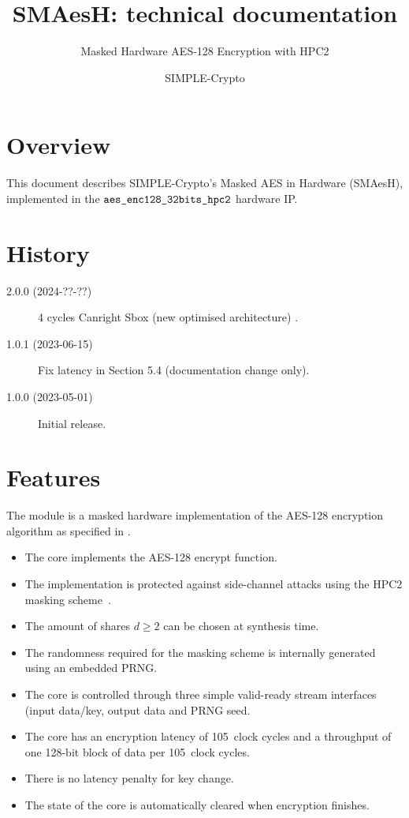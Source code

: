 \documentclass{scrartcl}
\title{SMAesH: technical documentation}
\subtitle{Masked Hardware AES-128 Encryption with HPC2}
\author{SIMPLE-Crypto}
\date{}
\begin{document}


\maketitle

\tableofcontents

\section{Overview}
\label{section:overview}
This document describes SIMPLE-Crypto's Masked AES in Hardware (SMAesH),
implemented in the $\texttt{aes\_enc128\_32bits\_hpc2}$ hardware IP. 

\section{History}

\begin{description}
    \item[2.0.0 (2024-??-??)] 4 cycles Canright Sbox (new optimised architecture) .
    \item[1.0.1 (2023-06-15)] Fix latency in Section 5.4 (documentation change only).
    \item[1.0.0 (2023-05-01)] Initial release.
\end{description}

\section{Features}
The \core module is a masked hardware implementation of the AES-128 encryption
algorithm as specified in \cite{nist197}. 

\begin{itemize}
\item{The core implements the AES-128 encrypt function.}
\item{The implementation is protected against side-channel attacks using the HPC2 masking scheme~\cite{DBLP:journals/tc/CassiersGLS21}.}
\item{The amount of shares $d\ge 2$ can be chosen at synthesis time.}
\item{The randomness required for the masking scheme is internally generated using an embedded PRNG.}
\item{The core is controlled through three simple valid-ready stream interfaces (input data/key, output data and PRNG seed.}
\item{The core has an encryption latency of 105~clock cycles and a throughput of one 128-bit block of data per 105~clock cycles.}
\item{There is no latency penalty for key change.}
\item{The state of the core is automatically cleared when encryption finishes.}
\end{itemize}
\end{document}
